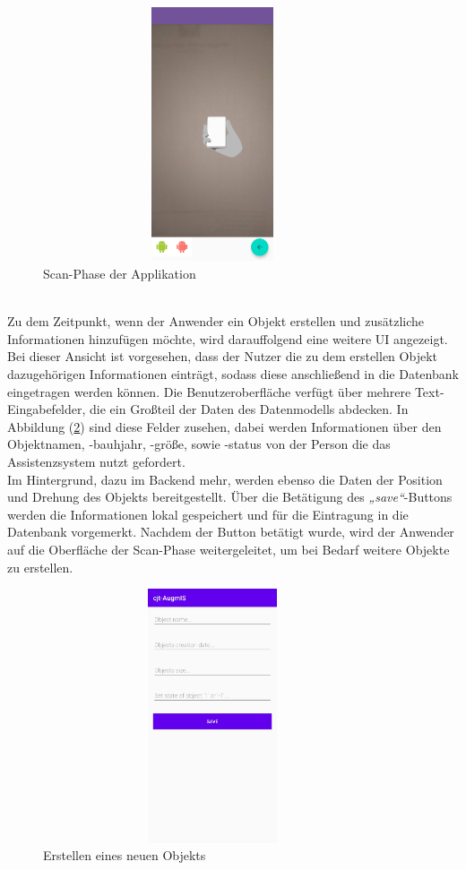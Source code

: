 \begin{figure}[hbt!]
    \centering
    \includegraphics[width=10cm,height=7.5cm,keepaspectratio]{4Umsetzung/Bilder/scan-phase.jpg}
    \caption{Scan-Phase der Applikation}
    \label{pic:scan}
\end{figure}
\\ 
\linebreak
Zu dem Zeitpunkt, wenn der Anwender ein Objekt erstellen und zusätzliche Informationen hinzufügen möchte, wird darauffolgend eine weitere \acs{UI} 
angezeigt. Bei dieser Ansicht ist vorgesehen, dass der Nutzer die zu dem erstellen Objekt dazugehörigen Informationen einträgt, sodass diese anschließend 
in die Datenbank eingetragen werden können. Die Benutzeroberfläche verfügt über mehrere Text-Eingabefelder, die ein Großteil der Daten des Datenmodells 
abdecken. In Abbildung (\ref{pic:createObject}) sind diese Felder zusehen, dabei werden Informationen über den Objektnamen, -bauhjahr, -größe, sowie 
-status von der Person die das Assistenzsystem nutzt gefordert. 
\\ 
Im Hintergrund, dazu im Backend mehr, werden ebenso die Daten der Position und Drehung des 
Objekts bereitgestellt. Über die Betätigung des \textit{„save“}-Buttons werden die Informationen lokal gespeichert und für die Eintragung in die Datenbank 
vorgemerkt. Nachdem der Button betätigt wurde, wird der Anwender auf die Oberfläche der Scan-Phase weitergeleitet, um bei Bedarf weitere Objekte zu 
erstellen.  
\begin{figure}[hbt!]
    \centering
    \includegraphics[width=10cm,height=7.5cm,keepaspectratio]{4Umsetzung/Bilder/objekt_info.jpg}
    \caption{Erstellen eines neuen Objekts}
    \label{pic:createObject}
\end{figure}
